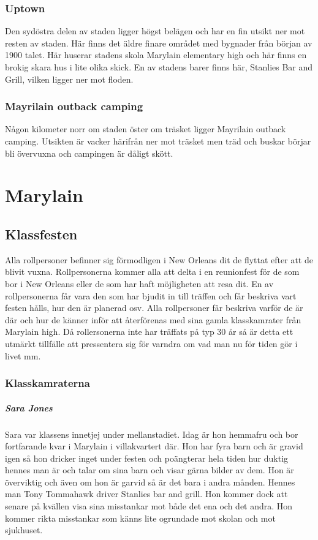 \documentclass[a5paper,10pt]{report}
\begin{document}
\subsection{Uptown}
Den sydöstra delen av staden ligger högst belägen och har en fin utsikt ner mot resten av staden. Här finns det äldre finare området med bygnader från början av 1900 talet. Här huserar stadens skola Marylain elementary high och här finns en brokig skara hus i lite olika skick. En av stadens barer finns här, Stanlies Bar and Grill, vilken ligger ner mot floden.
\subsection{Mayrilain outback camping}
Någon kilometer norr om staden öster om träsket ligger Mayrilain outback camping. Utsikten är vacker härifrån ner mot träsket men träd och buskar börjar bli övervuxna och campingen är dåligt skött.
\chapter{Marylain}

\section{Klassfesten}
Alla rollpersoner befinner sig förmodligen i New Orleans dit de flyttat efter att de blivit vuxna. Rollpersonerna kommer alla att delta i en reunionfest för de som bor i New Orleans eller de som har haft möjligheten att resa dit. En av rollpersonerna får vara den som har bjudit in till träffen och får beskriva vart festen hålls, hur den är planerad osv. Alla rollpersoner får beskriva varför de är där och hur de känner inför att återförenas med sina gamla klasskamrater från Marylain high. Då rollersonerna inte har träffats på typ 30 år så är detta ett utmärkt tillfälle att pressentera sig för varndra om vad man nu för tiden gör i livet mm.
\subsection{Klasskamraterna}
\paragraph{Sara Jones}
Sara var klassens innetjej under mellanstadiet. Idag är hon hemmafru och bor fortfarande kvar i Marylain i villakvartert där. Hon har fyra barn och är gravid igen så hon dricker inget under festen och poängterar hela tiden hur duktig hennes man är och talar om sina barn och visar gärna bilder av dem. Hon är överviktig och även om hon är garvid så är det bara i andra månden. Hennes man Tony Tommahawk driver Stanlies bar and grill. Hon kommer dock att senare på kvällen visa sina misstankar mot både det ena och det andra. Hon kommer rikta misstankar som känns lite ogrundade mot skolan och mot sjukhuset.
\end{document}
